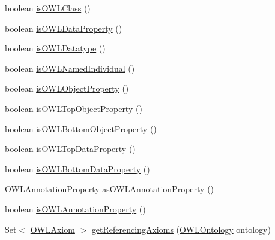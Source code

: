 \begin{DoxyCompactItemize}
\item 
boolean \hyperlink{classuk_1_1ac_1_1manchester_1_1cs_1_1owl_1_1owlapi_1_1_o_w_l_data_property_impl_a4b2aba22f16d980a7b609fd87a9ffc5f}{is\-O\-W\-L\-Class} ()
\item 
boolean \hyperlink{classuk_1_1ac_1_1manchester_1_1cs_1_1owl_1_1owlapi_1_1_o_w_l_data_property_impl_a22911b018025cb749e556084d6af396a}{is\-O\-W\-L\-Data\-Property} ()
\item 
boolean \hyperlink{classuk_1_1ac_1_1manchester_1_1cs_1_1owl_1_1owlapi_1_1_o_w_l_data_property_impl_ac54ca3699ead9ecddb1d87eb5876ff92}{is\-O\-W\-L\-Datatype} ()
\item 
boolean \hyperlink{classuk_1_1ac_1_1manchester_1_1cs_1_1owl_1_1owlapi_1_1_o_w_l_data_property_impl_a580e3912cca3c6134b1715b488536b61}{is\-O\-W\-L\-Named\-Individual} ()
\item 
boolean \hyperlink{classuk_1_1ac_1_1manchester_1_1cs_1_1owl_1_1owlapi_1_1_o_w_l_data_property_impl_a89c4c381096d2be614bd48fc214c8a90}{is\-O\-W\-L\-Object\-Property} ()
\item 
boolean \hyperlink{classuk_1_1ac_1_1manchester_1_1cs_1_1owl_1_1owlapi_1_1_o_w_l_data_property_impl_ae179334f741472e740889791bb1e62ae}{is\-O\-W\-L\-Top\-Object\-Property} ()
\item 
boolean \hyperlink{classuk_1_1ac_1_1manchester_1_1cs_1_1owl_1_1owlapi_1_1_o_w_l_data_property_impl_a11d9c526b9cc576b5226a3eaf668d29f}{is\-O\-W\-L\-Bottom\-Object\-Property} ()
\item 
boolean \hyperlink{classuk_1_1ac_1_1manchester_1_1cs_1_1owl_1_1owlapi_1_1_o_w_l_data_property_impl_afb33e131425398b3ee36057c9b6f4cae}{is\-O\-W\-L\-Top\-Data\-Property} ()
\item 
boolean \hyperlink{classuk_1_1ac_1_1manchester_1_1cs_1_1owl_1_1owlapi_1_1_o_w_l_data_property_impl_a309f7c1c78b9b7ab6687db4f834f5453}{is\-O\-W\-L\-Bottom\-Data\-Property} ()
\item 
\hyperlink{interfaceorg_1_1semanticweb_1_1owlapi_1_1model_1_1_o_w_l_annotation_property}{O\-W\-L\-Annotation\-Property} \hyperlink{classuk_1_1ac_1_1manchester_1_1cs_1_1owl_1_1owlapi_1_1_o_w_l_data_property_impl_af41b0a53fc445867ae4d98be2e34f7fb}{as\-O\-W\-L\-Annotation\-Property} ()
\item 
boolean \hyperlink{classuk_1_1ac_1_1manchester_1_1cs_1_1owl_1_1owlapi_1_1_o_w_l_data_property_impl_ab1fab6ffb4c9571d980fe75d462ab4b0}{is\-O\-W\-L\-Annotation\-Property} ()
\item 
Set$<$ \hyperlink{interfaceorg_1_1semanticweb_1_1owlapi_1_1model_1_1_o_w_l_axiom}{O\-W\-L\-Axiom} $>$ \hyperlink{classuk_1_1ac_1_1manchester_1_1cs_1_1owl_1_1owlapi_1_1_o_w_l_data_property_impl_a601f456294fde64b708501e5e23ba8a0}{get\-Referencing\-Axioms} (\hyperlink{interfaceorg_1_1semanticweb_1_1owlapi_1_1model_1_1_o_w_l_ontology}{O\-W\-L\-Ontology} ontology)

\end{DoxyCompactItemize}
